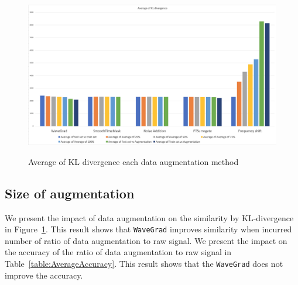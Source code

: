 \begin{figure}[ht]
    \centering
    \caption[Average of KL divergence]{Average of KL divergence each data augmentation method}
    \includegraphics[width=1\textwidth]{fig/Avg_KL.png}
    \label{fig:KL-average}
  \end{figure}

\subsection{Size of augmentation}
We present the impact of data augmentation on the similarity by KL-divergence in Figure~\ref{fig:KL-average}.
This result shows that \texttt{WaveGrad} improves similarity when incurred number of ratio of data augmentation to raw signal.
We present the impact on the accuracy of the ratio of data augmentation to raw signal in Table~\ref{table:AverageAccuracy}.
This result shows that the \texttt{WaveGrad} does not improve the accuracy.

